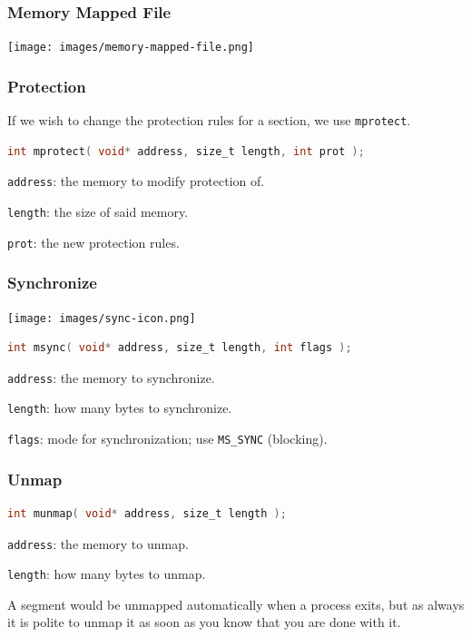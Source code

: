 \begin{frame}
	\frametitle{Memory Mapped File}

	\begin{center}
		\texttt{[image: images/memory-mapped-file.png]}
	\end{center}

\end{frame}


\begin{frame}[fragile]
	\frametitle{Protection}

	If we wish to change the protection rules for a section, we use \texttt{mprotect}.

	\begin{lstlisting}[language=C]
int mprotect( void* address, size_t length, int prot );
\end{lstlisting}

	\texttt{address}: the memory to modify protection of.

	\texttt{length}: the size of said memory.

	\texttt{prot}: the new protection rules.

\end{frame}


\begin{frame}[fragile]
	\frametitle{Synchronize}

	\begin{center}
		\texttt{[image: images/sync-icon.png]}
	\end{center}

	\begin{lstlisting}[language=C]
int msync( void* address, size_t length, int flags );
\end{lstlisting}

	\texttt{address}: the memory to synchronize.

	\texttt{length}: how many bytes to synchronize.

	\texttt{flags}: mode for synchronization; use \texttt{MS\_SYNC} (blocking).

\end{frame}


\begin{frame}[fragile]
	\frametitle{Unmap}

	\begin{lstlisting}[language=C]
int munmap( void* address, size_t length );
\end{lstlisting}

	\texttt{address}: the memory to unmap.

	\texttt{length}: how many bytes to unmap.

	A segment would be unmapped automatically when a process exits, but as always it is polite to unmap it as soon as you know that you are done with it.

\end{frame}

